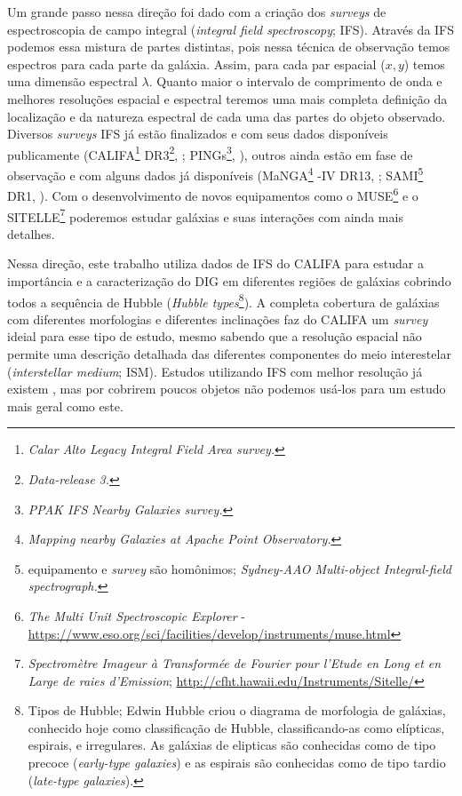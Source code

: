Um grande passo nessa direção foi dado com a criação dos {\em surveys} de espectroscopia de campo integral ({\em integral field spectroscopy}; IFS). Através da IFS podemos  essa mistura de partes distintas, pois nessa técnica de observação temos espectros para cada parte da galáxia. Assim, para cada par espacial ($x,y$) temos uma dimensão espectral $\lambda$. Quanto maior o intervalo de comprimento de onda e melhores resoluções espacial e espectral teremos uma mais completa definição da localização e da natureza espectral de cada uma das partes do objeto observado. Diversos {\em surveys} IFS já estão finalizados e com seus dados disponíveis publicamente (CALIFA\footnote{\em Calar Alto Legacy Integral Field Area survey.} DR3\footnote{\em Data-release 3.}, \citealt{SFSanchez.DR3.2016}; PINGs\footnote{\em PPAK IFS Nearby Galaxies survey.}, \citealt{RosalesOrtega.etal.2010}), outros ainda estão em fase de observação e com alguns dados já disponíveis (MaNGA\footnote{\em Mapping nearby Galaxies at Apache Point Observatory.} \SDSS-IV DR13, \citealt{MaNGADR1.2017}; SAMI\footnote{equipamento e {\em survey} são homônimos; {\em Sydney-AAO Multi-object Integral-field spectrograph.}} DR1, \citealt{SAMIDR1.2017}). Com o desenvolvimento de novos equipamentos como o MUSE\footnote{{\em The Multi Unit Spectroscopic Explorer} - \href{https://www.eso.org/sci/facilities/develop/instruments/muse.html}{https://www.eso.org/sci/facilities/develop/instruments/muse.html}} e o SITELLE\footnote{{\em Spectromètre Imageur à Transformée de Fourier pour l'Etude en Long et en Large de raies d'Emission}; \href{http://cfht.hawaii.edu/Instruments/Sitelle/}{http://cfht.hawaii.edu/Instruments/Sitelle/}} poderemos estudar galáxias e suas interações com ainda mais detalhes.

Nessa direção, este trabalho utiliza dados de IFS do CALIFA para estudar a importância e a caracterização do DIG em diferentes regiões de galáxias cobrindo todos a sequência de Hubble ({\em Hubble types}\footnote{Tipos de Hubble; Edwin Hubble criou o diagrama de morfologia de galáxias, conhecido hoje como classificação de Hubble, classificando-as como elípticas, espirais, e irregulares. As galáxias de elipticas são conhecidas como de tipo precoce ({\em early-type galaxies}) e as espirais são conhecidas como de tipo tardio ({\em late-type galaxies}).}). A completa cobertura de galáxias com diferentes morfologias e diferentes inclinações faz do CALIFA um {\em survey} ideial para esse tipo de estudo, mesmo sabendo que a resolução espacial não permite uma descrição detalhada das diferentes componentes do meio interestelar ({\em interstellar medium}; ISM). Estudos utilizando IFS com melhor resolução já existem \citep{Sanchez.etal.2015MUSE, Vogt.etal.2017a, RousseauNepton.etal.2017}, mas por cobrirem poucos objetos não podemos usá-los para um estudo mais geral como este.


